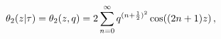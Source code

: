 \[\mathop{\theta_{2}\/}\nolimits\!\left(z\middle|\tau\right)=\mathop{\theta_{2}%
\/}\nolimits\!\left(z,q\right)=2\sum\limits_{n=0}^{\infty}q^{(n+\frac{1}{2})^{%
2}}\mathop{\cos\/}\nolimits\!\left((2n+1)z\right),\]